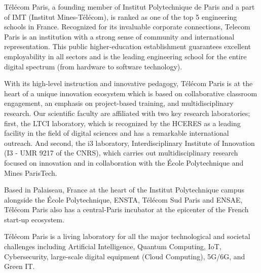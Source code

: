 Télécom Paris, a founding member of Institut Polytechnique de Paris and a part of IMT (Institut Mines-Télécom), is ranked as one of the top 5 engineering schools in France. Recognized for its invaluable corporate connections, Telecom Paris is an institution with a strong sense of community and international representation. This public higher-education establishment guarantees excellent employability in all sectors and is the leading engineering school for the entire digital spectrum (from hardware to software technology).

With its high-level instruction and innovative pedagogy, Télécom Paris is at the heart of a unique innovation ecosystem which is based on collaborative classroom engagement, an emphasis on project-based training, and multidisciplinary research. Our scientific faculty are affiliated with two key research laboratories; first, the LTCI laboratory, which is recognized by the HCERES as a leading facility in the field of digital sciences and has a remarkable international outreach. And second, the i3 laboratory, Interdisciplinary Institute of Innovation (I3 - UMR 9217 of the CNRS), which carries out multidisciplinary research focused on innovation and in collaboration with the École Polytechnique and Mines ParisTech. 

Based in Palaiseau, France at the heart of the Institut Polytechnique campus alongside the École Polytechnique, ENSTA, Télécom Sud Paris and ENSAE, Télécom Paris also has a central-Paris incubator at the epicenter of the French start-up ecosystem. 

Télécom Paris is a living laboratory for all the major technological and societal challenges including Artificial Intelligence, Quantum Computing, IoT, Cybersecurity, large-scale digital equipment (Cloud Computing), 5G/6G, and Green IT.